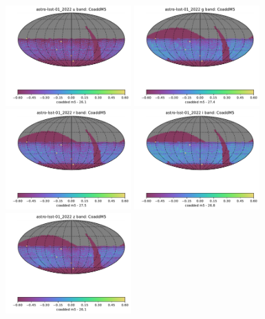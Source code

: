 \documentclass[DM,lsstdraft,authoryear,toc]{lsstdoc}
\begin{document}
\begin{figure}[ht]
\centering
\includegraphics[width=0.43\textwidth]{figures/astro-lsst-01_2022_CoaddM5_u_band_HEAL_SkyMap}
\includegraphics[width=0.43\textwidth]{figures/astro-lsst-01_2022_CoaddM5_g_band_HEAL_SkyMap} \\
\includegraphics[width=0.43\textwidth]{figures/astro-lsst-01_2022_CoaddM5_r_band_HEAL_SkyMap}
\includegraphics[width=0.43\textwidth]{figures/astro-lsst-01_2022_CoaddM5_i_band_HEAL_SkyMap}  \\
\includegraphics[width=0.43\textwidth]{figures/astro-lsst-01_2022_CoaddM5_z_band_HEAL_SkyMap}

\end{figure}
\end{document}
